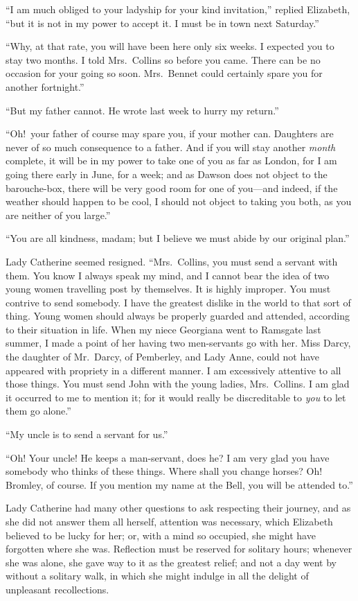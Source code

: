 \documentclass[12pt,english]{book}
\begin{document}
{}``I am much obliged to your ladyship for your kind invitation,''
replied Elizabeth, {}``but it is not in my power to accept it. I
must be in town next Saturday.''

{}``Why, at that rate, you will have been here only six weeks. I
expected you to stay two months. I told Mrs.\ Collins so before you
came. There can be no occasion for your going so soon. Mrs.\ Bennet
could certainly spare you for another fortnight.''

{}``But my father cannot. He wrote last week to hurry my return.''

{}``Oh!\ your father of course may spare you, if your mother can.
Daughters are never of so much consequence to a father. And if you
will stay another \textit{month} complete, it will be in my power
to take one of you as far as London, for I am going there early in
June, for a week; and as Dawson does not object to the barouche-box,
there will be very good room for one of you\mbox{---}and indeed,
if the weather should happen to be cool, I should not object to taking
you both, as you are neither of you large.''

{}``You are all kindness, madam; but I believe we must abide by our
original plan.''

Lady Catherine seemed resigned. {}``Mrs.\ Collins, you must send
a servant with them. You know I always speak my mind, and I cannot
bear the idea of two young women travelling post by themselves. It
is highly improper. You must contrive to send somebody. I have the
greatest dislike in the world to that sort of thing. Young women should
always be properly guarded and attended, according to their situation
in life. When my niece Georgiana went to Ramsgate last summer, I made
a point of her having two men-servants go with her. Miss Darcy, the
daughter of Mr.\ Darcy, of Pemberley, and Lady Anne, could not have
appeared with propriety in a different manner. I am excessively attentive
to all those things. You must send John with the young ladies, Mrs.\ Collins.
I am glad it occurred to me to mention it; for it would really be
discreditable to \textit{you} to let them go alone.''

{}``My uncle is to send a servant for us.''

{}``Oh! Your uncle! He keeps a man-servant, does he? I am very glad
you have somebody who thinks of these things. Where shall you change
horses? Oh! Bromley, of course. If you mention my name at the Bell,
you will be attended to.''

Lady Catherine had many other questions to ask respecting their journey,
and as she did not answer them all herself, attention was necessary,
which Elizabeth believed to be lucky for her; or, with a mind so occupied,
she might have forgotten where she was. Reflection must be reserved
for solitary hours; whenever she was alone, she gave way to it as
the greatest relief; and not a day went by without a solitary walk,
in which she might indulge in all the delight of unpleasant recollections.
\end{document}
